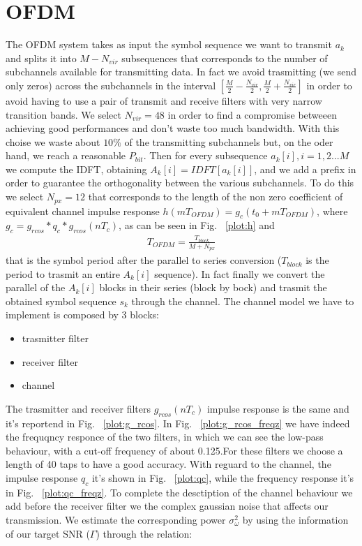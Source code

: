 \documentclass[a4paper,oneside]{article}
\begin{document}
\section{OFDM}
\label{sec:ofdm}
The OFDM system takes as input the symbol sequence we want to transmit $a_k$ and splits it into $M-N_{vir}$ subsequences that corresponds to the number of subchannels available for transmitting data. In fact we avoid trasmitting (we send only zeros) across the subchannels in the interval $[\frac{M}{2}-\frac{N_{vir}}{2},\frac{M}{2}+\frac{N_{vir}}{2}]$ in order to avoid having to use a pair of transmit and receive filters with very narrow transition bands.
We select $N_{vir} = 48$ in order to find a compromise betweeen achieving good performances and don't waste too much bandwidth. With this choise we waste about $ 10\% $ of the transmitting subchannels but, on the oder hand, we reach a reasonable $ P_{bit} $.
Then for every subsequence $a_k[i], i = 1,2...M$ we compute the IDFT, obtaining $A_k[i] = IDFT[a_k[i]]$, and we add a prefix in order to guarantee the orthogonality between the various subchannels. To do this we select $N_{px} = 12$ that corresponds to the length of the non zero coefficient of equivalent channel impulse response $h(mT_{OFDM}) = g_c(t_0+ mT_{OFDM})$, where $g_c = g_{rcos}*q_c*g_{rcos}(nT_c)$, as can be seen in Fig. ~\ref{plot:h} and 
\begin{align*}
T_{OFDM} = \frac{T_{block}}{M+N_{px}}
\end{align*} 
that is the symbol period after the parallel to series conversion ($T_{block}$ is the period to trasmit an entire $A_k[i]$ sequence).
In fact finally we convert the parallel of the $A_k[i]$ blocks in their series (block by bock) and trasmit the obtained symbol sequence $s_k$ through the channel.
\newline The channel model we have to implement is composed by 3 blocks:
\begin{itemize}
\item trasmitter filter
\item receiver filter
\item channel
\end{itemize} 
The trasmitter and receiver filters $g_{rcos}(nT_c)$ impulse response is the same and it's reportend in Fig. ~\ref{plot:g_rcos}. In Fig. ~\ref{plot:g_rcos_freqz} we have indeed the frequqncy responce of the two filters, in which we can see the low-pass behaviour, with a cut-off frequency of about 0.125.For these filters we choose a length of 40 taps to have a good accuracy. With reguard to the channel, the impulse response $q_c$ it's shown in Fig. ~\ref{plot:qc}, while the frequency response it's in Fig. ~\ref{plot:qc_freqz}.
To complete the desctiption of the channel behaviour we add before the receiver filter we the complex gaussian noise that affects our transmission. We estimate the corresponding power $\sigma_{\omega}^2$ by using the information of our target SNR ($\Gamma$) through the relation:
\end{document}
